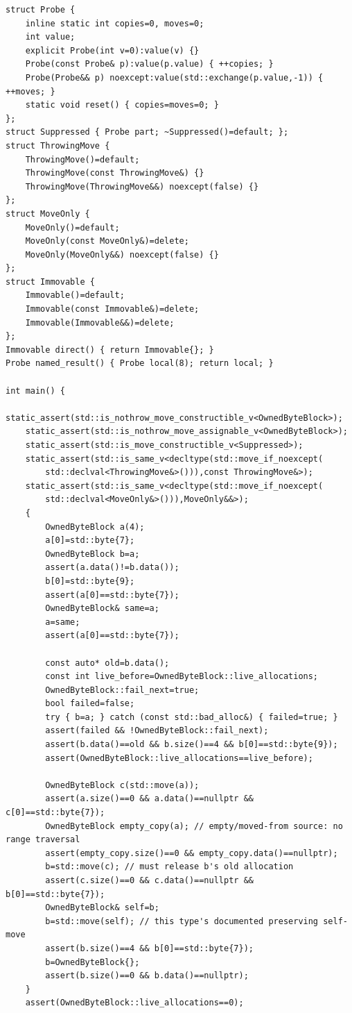 \begin{verbatim}
struct Probe {
    inline static int copies=0, moves=0;
    int value;
    explicit Probe(int v=0):value(v) {}
    Probe(const Probe& p):value(p.value) { ++copies; }
    Probe(Probe&& p) noexcept:value(std::exchange(p.value,-1)) { ++moves; }
    static void reset() { copies=moves=0; }
};
struct Suppressed { Probe part; ~Suppressed()=default; };
struct ThrowingMove {
    ThrowingMove()=default;
    ThrowingMove(const ThrowingMove&) {}
    ThrowingMove(ThrowingMove&&) noexcept(false) {}
};
struct MoveOnly {
    MoveOnly()=default;
    MoveOnly(const MoveOnly&)=delete;
    MoveOnly(MoveOnly&&) noexcept(false) {}
};
struct Immovable {
    Immovable()=default;
    Immovable(const Immovable&)=delete;
    Immovable(Immovable&&)=delete;
};
Immovable direct() { return Immovable{}; }
Probe named_result() { Probe local(8); return local; }

int main() {
    static_assert(std::is_nothrow_move_constructible_v<OwnedByteBlock>);
    static_assert(std::is_nothrow_move_assignable_v<OwnedByteBlock>);
    static_assert(std::is_move_constructible_v<Suppressed>);
    static_assert(std::is_same_v<decltype(std::move_if_noexcept(
        std::declval<ThrowingMove&>())),const ThrowingMove&>);
    static_assert(std::is_same_v<decltype(std::move_if_noexcept(
        std::declval<MoveOnly&>())),MoveOnly&&>);
    {
        OwnedByteBlock a(4);
        a[0]=std::byte{7};
        OwnedByteBlock b=a;
        assert(a.data()!=b.data());
        b[0]=std::byte{9};
        assert(a[0]==std::byte{7});
        OwnedByteBlock& same=a;
        a=same;
        assert(a[0]==std::byte{7});

        const auto* old=b.data();
        const int live_before=OwnedByteBlock::live_allocations;
        OwnedByteBlock::fail_next=true;
        bool failed=false;
        try { b=a; } catch (const std::bad_alloc&) { failed=true; }
        assert(failed && !OwnedByteBlock::fail_next);
        assert(b.data()==old && b.size()==4 && b[0]==std::byte{9});
        assert(OwnedByteBlock::live_allocations==live_before);

        OwnedByteBlock c(std::move(a));
        assert(a.size()==0 && a.data()==nullptr && c[0]==std::byte{7});
        OwnedByteBlock empty_copy(a); // empty/moved-from source: no range traversal
        assert(empty_copy.size()==0 && empty_copy.data()==nullptr);
        b=std::move(c); // must release b's old allocation
        assert(c.size()==0 && c.data()==nullptr && b[0]==std::byte{7});
        OwnedByteBlock& self=b;
        b=std::move(self); // this type's documented preserving self-move
        assert(b.size()==4 && b[0]==std::byte{7});
        b=OwnedByteBlock{};
        assert(b.size()==0 && b.data()==nullptr);
    }
    assert(OwnedByteBlock::live_allocations==0);


\end{verbatim}
